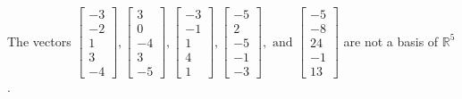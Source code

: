 \begin{exercise}
\begin{exerciseStatement}
  \end{exerciseStatement}
  \begin{exerciseAnswer}
   The vectors \(\left[\begin{array}{r}
-3 \\
-2 \\
1 \\
3 \\
-4
\end{array}\right] , \left[\begin{array}{r}
3 \\
0 \\
-4 \\
3 \\
-5
\end{array}\right] , \left[\begin{array}{r}
-3 \\
-1 \\
1 \\
4 \\
1
\end{array}\right] , \left[\begin{array}{r}
-5 \\
2 \\
-5 \\
-1 \\
-3
\end{array}\right] , \text{ and } \left[\begin{array}{r}
-5 \\
-8 \\
24 \\
-1 \\
13
\end{array}\right]\) 
  	 are not  a basis of \(\mathbb{R}^5\).
  


  \end{exerciseAnswer}
\end{exercise}